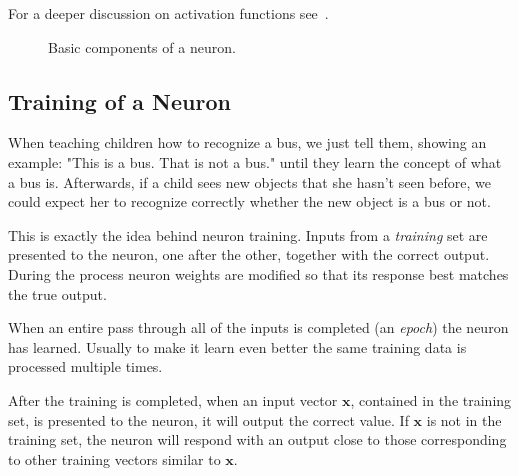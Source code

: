 For a deeper discussion on activation functions see~\cite{bib:activation_function}.

\begin{figure}[htb]
\centering
{}
\caption{Basic components of a neuron.}
\label{fig:sigmoid}
\end{figure}

\subsection{Training of a Neuron}
\label{training-of-a-neuron}

When teaching children how to recognize a bus, we just tell them, showing an example: "This is a bus. That is not a bus." until they learn the concept of what a bus is. Afterwards, if a child sees new objects that she hasn't seen before, we could expect her to recognize correctly whether the new object is a bus or not.

This is exactly the idea behind neuron training. Inputs from a \emph{training} set are presented to the neuron,  one after the other, together with the correct output. During the process neuron weights are modified so that its response best matches the true output.

When an entire pass through all of the inputs is completed (an \emph{epoch}) the neuron has learned. Usually to make it learn even better the same training data is processed multiple times.

After the training is completed, when an input vector \(\mathbf{x}\), contained in the training set, is presented to the neuron, it will output the correct value. If \(\mathbf{x}\) is not in the training set, the neuron will respond with an output close to those corresponding to other training vectors similar to \(\mathbf{x}\).

